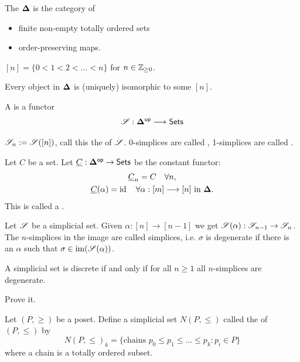 \begin{definition}
	The  $\mathbf{\Delta}$ is the category of
	\begin{itemize}
		\item finite non-empty totally ordered sets
		\item order-preserving maps.
	\end{itemize}
\end{definition}
\begin{notation}
	$[n]=\{0<1<2<\dots<n\} $ for $n\in \mathbb Z_{\ge 0}$.
\end{notation}
Every object in $\mathbf{\Delta}$ is (uniquely) isomorphic to some $[n]$.
\begin{definition}
	A  is a functor
	\[
		\CS:\bb{\Delta}\op \to \Set
	\]
\end{definition}
\begin{notation}
	$\mathscr S_n := \mathscr S([n])$, call this the  of $\mathscr S$. 0-simplices
	are called , 1-simplices are called .
\end{notation}
\begin{example}
	Let $C$ be a set. Let $\ul{C}:\bb{\Delta}\op\to \Set$ be the constant functor:
	\begin{gather*}
		\ul{C}_n = C\quad \forall n, \\
		\ul{C}(\alpha) = \id \quad \forall \alpha:[m]\to [n] \text{ in }\bb{\Delta}.
	\end{gather*}
	This is called a .
\end{example}
\begin{definition}
	Let $\mathscr S$ be a simplicial set. Given $\alpha:[n]\to [n-1]$ we get
	$\CS(\alpha):\CS_{n-1}\to \CS_n$. The $n$-simplices in the image are called
	 simplices, i.e. $\sigma$ is degenerate if there is an $\alpha$ such
	that $\sigma\in \operatorname{im}(\mathscr S(\alpha))$.
\end{definition}
\begin{lemma}
	A simplicial set is discrete if and only if for all $n\ge 1$ all $n$-simplices are degenerate.
\end{lemma}
\begin{exercise}
	Prove it.
\end{exercise}
\begin{example}
	Let $(P,\ge )$ be a poset. Define a simplicial set $N(P,\le )$ called the 
	of $(P,\le )$ by
	\[
		N(P,\le )_k = \{\text{chains }p_0\le p_1\le \dots\le p_k: p_i\in P\}
	\]
	where a chain is a totally ordered subset.
\end{example}
